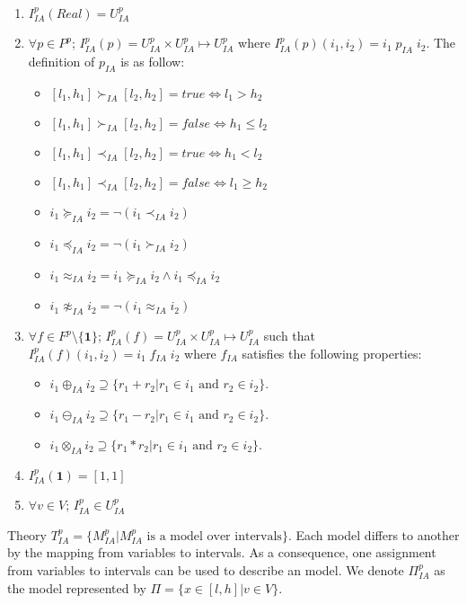 \begin{enumerate}
\item $I^p_{IA}(Real) = U^p_{IA}$
\item $\forall p \in P^p$; $I^p_{IA}(p)= U^p_{IA} \times U^p_{IA} \mapsto U^p_{IA}$ where $I^p_{IA}(p)(i_1, i_2) = i_1 \; p_{IA} \; i_2$. The definition of $ p_{IA}$ is as follow:
\begin{itemize}
\item $[l_1, h_1] \succ_{IA} [l_2,  h_2] = true \iff l_1 > h_2$
\item $[l_1, h_1] \succ_{IA} [l_2,  h_2] = false \iff h_1 \le l_2$
\item $[l_1, h_1] \prec_{IA} [l_2,  h_2] = true \iff h_1 < l_2$
\item $[l_1, h_1] \prec_{IA} [l_2,  h_2] = false \iff l_1 \ge h_2$
\item $i_1 \succeq_{IA} i_2 = \neg(i_1 \prec_{IA} i_2)$
\item $i_1 \preceq_{IA} i_2 = \neg(i_1 \succ_{IA} i_2)$
\item $i_1 \approx_{IA} i_2 = i_1 \succeq_{IA} i_2 \wedge i_1 \preceq_{IA} i_2$
\item $i_1 \not\approx_{IA} i_2 = \neg(i_1 \approx_{IA} i_2)$
\end{itemize}
\item $\forall f \in F^p \setminus \{\mathbf{1}\}$; $I^p_{IA}(f) = U^p_{IA} \times U^p_{IA} \mapsto U^p_{IA}$ such that $ I^p_{IA}(f)(i_1, i_2)= i_1 \; f_{IA} \; i_2$ where $f_{IA}$ satisfies the following properties:
\begin{itemize}
\item $i_1 \oplus_{IA} i_2 \supseteq \{r_1 + r_2| r_1 \in i_1 \text{ and } r_2 \in i_2\}$.
\item $i_1 \ominus_{IA} i_2 \supseteq \{r_1 - r_2| r_1 \in i_1 \text{ and } r_2 \in i_2\}$.
\item $i_1 \otimes_{IA} i_2 \supseteq \{r_1 * r_2| r_1 \in i_1 \text{ and } r_2 \in i_2\}$.
\end{itemize}
\item $I^p_{IA}(\mathbf{1}) = [1,1]$
\item $\forall v \in V$; $I^p_{IA} \in U^p_{IA}$
\end{enumerate}
Theory $T^p_{IA} = \{M^p_{IA}| M^p_{IA} \text{ is a model over intervals}\}$. Each model differs to another by the mapping from variables to intervals. As a consequence, one assignment from variables to intervals can be used to describe an model. We denote $\Pi^p_{IA}$ as the model represented by $\Pi = \{x \in [l, h] | v \in V\}$. 

